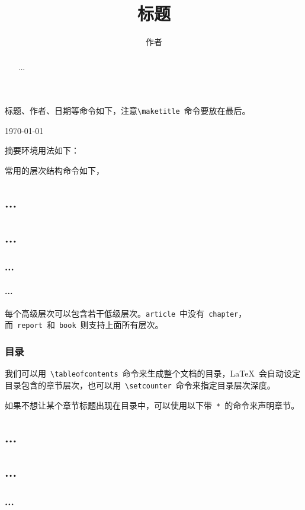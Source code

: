 标题、作者、日期等命令如下，注意\verb|\maketitle|~命令要放在最后。
\begin{code}
\title{标题}
\author{作者}
\today
\maketitle
\end{code}

摘要环境用法如下：
\begin{code}
\begin{abstract}
...
\end{abstract}
\end{code}

常用的层次结构命令如下，
\begin{code}
\chapter{...}
\section{...}
\subsection{...}
\subsubsection{...}
\end{code}

每个高级层次可以包含若干低级层次。\verb|article|~中没有~\verb|chapter|，而~\verb|report|~和~\verb|book|~则支持上面所有层次。

\subsection{目录}

我们可以用~\verb|\tableofcontents|~命令来生成整个文档的目录，\LaTeX~会自动设定目录包含的章节层次，也可以用~\verb|\setcounter|~命令来指定目录层次深度。
\begin{code}
\tableofcontents
\setcounter{tocdepth}{2}
\end{code}

如果不想让某个章节标题出现在目录中，可以使用以下带~\verb|*|~的命令来声明章节。
\begin{code}
\chapter*{...}
\section*{...}
\subsection*{...}
\end{code}

